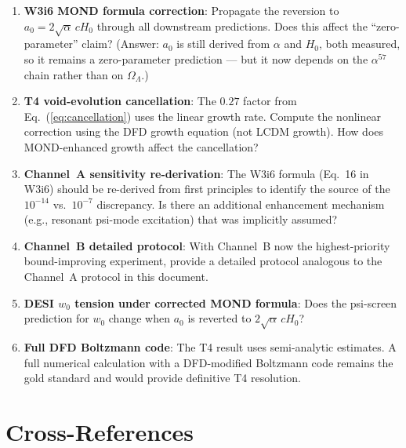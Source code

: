 \documentclass[11pt]{article}
\newcommand{\aM}{a_0}
\newcommand{\Hzero}{H_0}
\begin{document}
\begin{enumerate}
\item \textbf{W3i6 MOND formula correction}: Propagate the reversion
  to $\aM = 2\sqrt{\alpha}\,c\Hzero$ through all downstream predictions.
  Does this affect the ``zero-parameter'' claim? (Answer: $\aM$ is
  still derived from $\alpha$ and $\Hzero$, both measured, so it
  remains a zero-parameter prediction --- but it now depends on the
  $\alpha^{57}$ chain rather than on $\Omega_\Lambda$.)

\item \textbf{T4 void-evolution cancellation}: The $0.27$ factor from
  Eq.~(\ref{eq:cancellation}) uses the linear growth rate. Compute
  the nonlinear correction using the DFD growth equation (not LCDM
  growth). How does MOND-enhanced growth affect the cancellation?

\item \textbf{Channel~A sensitivity re-derivation}: The W3i6 formula
  (Eq.~16 in W3i6) should be re-derived from first principles to
  identify the source of the $10^{-14}$ vs.\ $10^{-7}$ discrepancy.
  Is there an additional enhancement mechanism (e.g., resonant
  psi-mode excitation) that was implicitly assumed?

\item \textbf{Channel~B detailed protocol}: With Channel~B now the
  highest-priority bound-improving experiment, provide a detailed
  protocol analogous to the Channel~A protocol in this document.

\item \textbf{DESI $w_0$ tension under corrected MOND formula}:
  Does the psi-screen prediction for $w_0$ change when $\aM$ is
  reverted to $2\sqrt{\alpha}\,c\Hzero$?

\item \textbf{Full DFD Boltzmann code}: The T4 result uses
  semi-analytic estimates. A full numerical calculation with a
  DFD-modified Boltzmann code remains the gold standard and would
  provide definitive T4 resolution.
\end{enumerate}

\section{Cross-References}
\label{sec:crossrefs}
\end{document}
